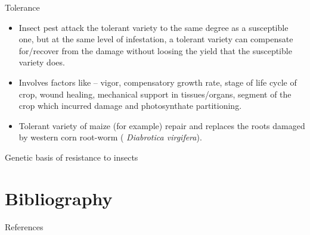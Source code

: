 \documentclass[11pt,dvipsnames,ignorenonframetext,aspectratio=169]{beamer}
\newif\ifbibliography
\providecommand{\tightlist}{%
  \setlength{\itemsep}{0pt}\setlength{\parskip}{0pt}}
\begin{document}
\begin{frame}{Tolerance}
\protect\hypertarget{tolerance-1}{}
\begin{itemize}
\tightlist
\item
  Insect pest attack the tolerant variety to the same degree as a
  susceptible one, but at the same level of infestation, a tolerant
  variety can compensate for/recover from the damage without loosing the
  yield that the susceptible variety does.
\item
  Involves factors like -- vigor, compensatory growth rate, stage of
  life cycle of crop, wound healing, mechanical support in
  tissues/organs, segment of the crop which incurred damage and
  photosynthate partitioning.
\item
  Tolerant variety of maize (for example) repair and replaces the roots
  damaged by western corn root-worm ( \emph{Diabrotica virgifera}).
\end{itemize}
\end{frame}

\begin{frame}{Genetic basis of resistance to insects}
\protect\hypertarget{genetic-basis-of-resistance-to-insects}{}
\end{frame}

\hypertarget{bibliography}{%
\section{Bibliography}\label{bibliography}}

\begin{frame}{References}
\protect\hypertarget{references}{}
\end{frame}

          \begin{frame}[allowframebreaks]{}
    \bibliographytrue
    
    \end{frame}
  
\end{document}
